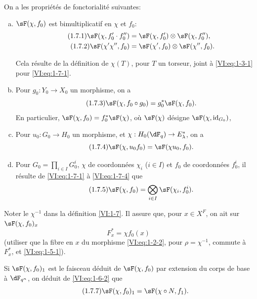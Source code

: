 \documentclass[oneside]{book}
\theoremstyle{sga-source}
\theoremstyle{sga-source-dash}
\theoremstyle{sga-source-dotdash}
\theoremstyle{sga-source-number-note-dash}
\theoremstyle{sga-source-note-number-dotdash}
\theoremstyle{sga-source-example-dotdash}
\theoremstyle{sga-source-inline-number}
\theoremstyle{sga-source-bare-number}
\theoremstyle{sga-source}
\newcommand{\PrintPage}[1]{}\newcommand{\MathPage}[1]{}\newcommand{\PrintCite}[2]{#1}\newcommand{\var}[3]{#1}
\begin{document}
On a les propriétés de fonctorialité suivantes:
\begin{enumerate}[a)]
  \item $\sF(\chi,f_0)$ est bimultiplicatif en $\chi$ et $f_0$: 
    \begin{align*}\tag{1.7.1}\label{VI:eq:1-7-1}
      \sF(\chi,f_0'\cdot f_0'') &= \sF(\chi,f_0')\otimes \sF(\chi,f_0'') \text{,} \\
      \tag{1.7.2}\label{VI:eq:1-7-2}
      \sF(\chi'\chi'',f_0) &= \sF(\chi',f_0)\otimes \sF(\chi'',f_0) \text{.}
    \end{align*}
    \PrintPage{173}
Cela résulte de la définition de $\chi(T)$, pour $T$ un torseur, \var{joint}{jointe}{S45-SOL-0685} 
    à \eqref{VI:eq:1-3-1} pour \eqref{VI:eq:1-7-1}. 
  \item Pour $g_0:Y_0\to X_0$ un morphisme, on a 
    \begin{equation*}\tag{1.7.3}\label{VI:eq:1-7-3}
      \sF(\chi,f_0\circ g_0) = g_0^\ast \sF(\chi,f_0) \text{.}
    \end{equation*}
    En particulier, $\sF(\chi,f_0) = f_0^\ast \sF(\chi)$, où $\sF(\chi)$ 
    désigne $\sF(\chi,\operatorname{id}_{G_0})$, 
  \item Pour $u_0:G_0\to H_0$ un morphisme, et 
    $\chi:H_0(\dF_q) \to E_\lambda^\ast$, on a 
    \begin{equation*}\tag{1.7.4}\label{VI:eq:1-7-4}
      \sF(\chi,u_0 f_0) = \sF(\chi u_0,f_0) \text{.}
    \end{equation*}
  \item Pour $G_0=\prod_{i\in I} G_0^i$, $\chi$ de coordonnées $\chi_i$ 
    ($i\in I$) et $f_0$ de coordonnées $f_0^i$, il résulte de 
    \eqref{VI:eq:1-7-1} à \eqref{VI:eq:1-7-4} que 
    \begin{equation*}\tag{1.7.5}\label{VI:eq:1-7-5}
      \sF(\chi,f_0) = \bigotimes_{i\in I} \sF(\chi_i,f_0^i) \text{.}
    \end{equation*}    
\end{enumerate}

Noter le $\chi^{-1}$ dans la définition \ref{VI:1-7}. Il assure que, pour 
$x\in X^F$, on ait sur $\sF(\chi,f_0)_x$ 
\begin{equation*}\tag{1.7.6}\label{VI:eq:1-7-6}
  F_x^\ast = \chi f_0(x)
\end{equation*}
(utiliser que la fibre en $x$ du morphisme \eqref{VI:eq:1-2-2}, pour 
$\rho=\chi^{-1}$, commute à $F_x^\ast$, et \eqref{VI:eq:1-5-1}). 

Si $\sF(\chi,f_0)_1$ est le faisceau déduit de $\sF(\chi,f_0)$ par extension 
du corps de base à $\dF_{q^n}$, on déduit de \eqref{VI:eq:1-6-2} que 
\begin{equation*}\tag{1.7.7}\label{VI:eq:1-7-7}
  \sF(\chi,f_0)_1 = \sF(\chi\circ N,f_1) \text{.}
\end{equation*}
\end{document}
